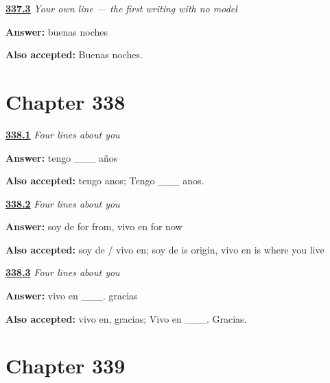 \noindent\begin{minipage}[t]{\linewidth}
\raggedright
\hyperlink{review-ES-W01-frase-propia-night}{\textbf{337.3}} \emph{Your own line — the first writing with no model}\par
\small \textbf{Answer:} buenas noches\par
\footnotesize \textbf{Also accepted:} Buenas noches.
\end{minipage}\par\medskip

\section*{Chapter 338}

\noindent\begin{minipage}[t]{\linewidth}
\raggedright
\hyperlink{review-ES-W01-ficha-personal-age}{\textbf{338.1}} \emph{Four lines about you}\par
\small \textbf{Answer:} tengo \_\_\_ años\par
\footnotesize \textbf{Also accepted:} tengo anos; Tengo \_\_\_ anos.
\end{minipage}\par\medskip

\noindent\begin{minipage}[t]{\linewidth}
\raggedright
\hyperlink{review-ES-W01-ficha-personal-from}{\textbf{338.2}} \emph{Four lines about you}\par
\small \textbf{Answer:} soy de for from, vivo en for now\par
\footnotesize \textbf{Also accepted:} soy de / vivo en; soy de is origin, vivo en is where you live
\end{minipage}\par\medskip

\noindent\begin{minipage}[t]{\linewidth}
\raggedright
\hyperlink{review-ES-W01-ficha-personal-close}{\textbf{338.3}} \emph{Four lines about you}\par
\small \textbf{Answer:} vivo en \_\_\_. gracias\par
\footnotesize \textbf{Also accepted:} vivo en, gracias; Vivo en \_\_\_. Gracias.
\end{minipage}\par\medskip

\section*{Chapter 339}

